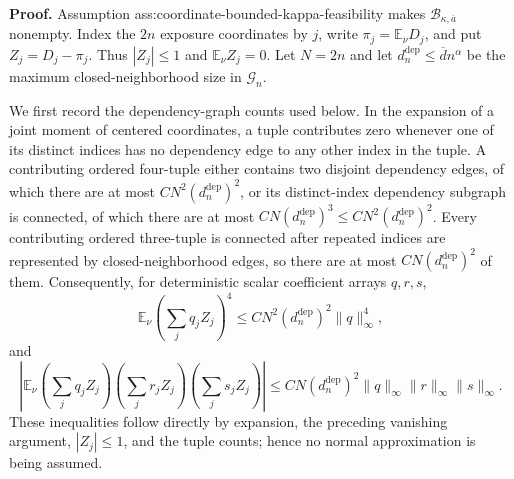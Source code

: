 \textbf{Proof.}
Assumption ass:coordinate-bounded-kappa-feasibility makes \(\mathcal B_{\kappa,\overline a}\) nonempty.  Index the \(2n\) exposure coordinates by \(j\), write \(\pi_j=\mathbb E_\nu D_j\), and put \(Z_j=D_j-\pi_j\).  Thus \(|Z_j|\leq1\) and \(\mathbb E_\nu Z_j=0\).  Let \(N=2n\) and let \(d_n^{\mathrm{dep}}\leq\overline d n^\alpha\) be the maximum closed-neighborhood size in \(\mathcal G_n\).

We first record the dependency-graph counts used below.  In the expansion of a joint moment of centered coordinates, a tuple contributes zero whenever one of its distinct indices has no dependency edge to any other index in the tuple.  A contributing ordered four-tuple either contains two disjoint dependency edges, of which there are at most \(C N^2(d_n^{\mathrm{dep}})^2\), or its distinct-index dependency subgraph is connected, of which there are at most \(C N(d_n^{\mathrm{dep}})^3\le C N^2(d_n^{\mathrm{dep}})^2\).  Every contributing ordered three-tuple is connected after repeated indices are represented by closed-neighborhood edges, so there are at most \(C N(d_n^{\mathrm{dep}})^2\) of them.  Consequently, for deterministic scalar coefficient arrays \(q,r,s\),
\[
 \mathbb E_\nu\!\left(\sum_jq_jZ_j\right)^4
 \leq C N^2(d_n^{\mathrm{dep}})^2\lVert q\rVert_\infty^4,
 \tag{1}
\]
and
\[
 \left|\mathbb E_\nu
 \left(\sum_jq_jZ_j\right)
 \left(\sum_jr_jZ_j\right)
 \left(\sum_js_jZ_j\right)\right|
 \leq C N(d_n^{\mathrm{dep}})^2
 \lVert q\rVert_\infty\lVert r\rVert_\infty\lVert s\rVert_\infty.
 \tag{2}
\]
These inequalities follow directly by expansion, the preceding vanishing argument, \(|Z_j|\leq1\), and the tuple counts; hence no normal approximation is being assumed.

